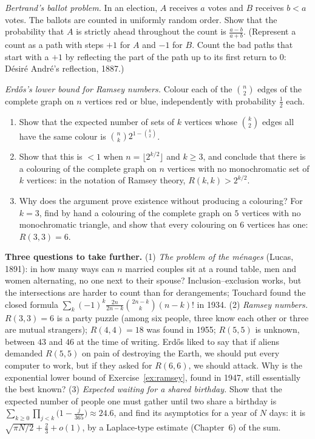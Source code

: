 \begin{exercise}[$\star\star\star$]\label{ex:ballot}
\emph{Bertrand's ballot problem.} In an election, $A$ receives $a$ votes and $B$ receives $b<a$ votes. The ballots are counted in uniformly random order. Show that the probability that $A$ is strictly ahead throughout the count is $\frac{a-b}{a+b}$. (Represent a count as a path with steps $+1$ for $A$ and $-1$ for $B$. Count the bad paths that start with a $+1$ by reflecting the part of the path up to its first return to $0$: D\'esir\'e Andr\'e's reflection, 1887.)
\end{exercise}

\begin{exercise}[$\star\star\star$]\label{ex:ramsey}
\emph{Erd\H os's lower bound for Ramsey numbers.} Colour each of the $\binom n2$ edges of the complete graph on $n$ vertices red or blue, independently with probability $\frac12$ each.
\begin{enumerate}[label=(\alph*)]
\item Show that the expected number of sets of $k$ vertices whose $\binom k2$ edges all have the same colour is $\binom nk2^{1-\binom k2}$.
\item Show that this is $<1$ when $n=\lfloor2^{k/2}\rfloor$ and $k\ge3$, and conclude that there is a colouring of the complete graph on $n$ vertices with no monochromatic set of $k$ vertices: in the notation of Ramsey theory, $R(k,k)>2^{k/2}$.
\item Why does the argument prove existence without producing a colouring? For $k=3$, find by hand a colouring of the complete graph on $5$ vertices with no monochromatic triangle, and show that every colouring on $6$ vertices has one: $R(3,3)=6$.
\end{enumerate}
\end{exercise}

\begin{challenge}
\textbf{Three questions to take further.} (1) \emph{The problem of the m\'enages} (Lucas, 1891): in how many ways can $n$ married couples sit at a round table, men and women alternating, no one next to their spouse? Inclusion--exclusion works, but the intersections are harder to count than for derangements; Touchard found the closed formula $\sum_k(-1)^k\frac{2n}{2n-k}\binom{2n-k}k(n-k)!$ in 1934. (2) \emph{Ramsey numbers.} $R(3,3)=6$ is a party puzzle (among six people, three know each other or three are mutual strangers); $R(4,4)=18$ was found in 1955; $R(5,5)$ is unknown, between $43$ and $46$ at the time of writing. Erd\H os liked to say that if aliens demanded $R(5,5)$ on pain of destroying the Earth, we should put every computer to work, but if they asked for $R(6,6)$, we should attack. Why is the exponential lower bound of Exercise~\ref{ex:ramsey}, found in 1947, still essentially the best known? (3) \emph{Expected waiting for a shared birthday.} Show that the expected number of people one must gather until two share a birthday is $\sum_{k\ge0}\prod_{j<k}\big(1-\frac j{365}\big)\approx24.6$, and find its asymptotics for a year of $N$ days: it is $\sqrt{\pi N/2}+\frac23+o(1)$, by a Laplace-type estimate (Chapter~6) of the sum.
\end{challenge}

